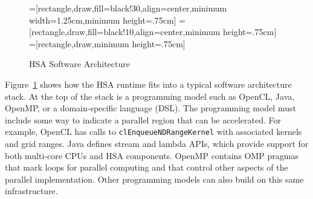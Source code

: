 \documentclass[final,oneside]{book}
\begin{document}
\begin{figure}[t]
  \centering
  =[rectangle,draw,fill=black!30,align=center,minimum width=1.25cm,minimum height=.75cm]
  =[rectangle,draw,fill=black!10,align=center,minimum height=.75cm]
  =[rectangle,draw,minimum height=.75cm]
  \caption{HSA Software Architecture}
  \label{fig:swarch}
\end{figure}

Figure~\ref{fig:swarch} shows how the HSA runtime fits into a typical software
architecture stack. At the top of the stack is a programming model such as
OpenCL\texttrademark, Java, OpenMP, or a domain-specific language (DSL). The
programming model must include some way to indicate a parallel region that can
be accelerated. For example, OpenCL has calls to \texttt{clEnqueueNDRangeKernel}
with associated kernels and grid ranges. Java defines stream and lambda APIs,
which provide support for both multi-core CPUs and HSA components. OpenMP
contains OMP pragmas that mark loops for parallel computing and that control
other aspects of the parallel implementation. Other programming models can also
build on this same infrastructure.
\end{document}

